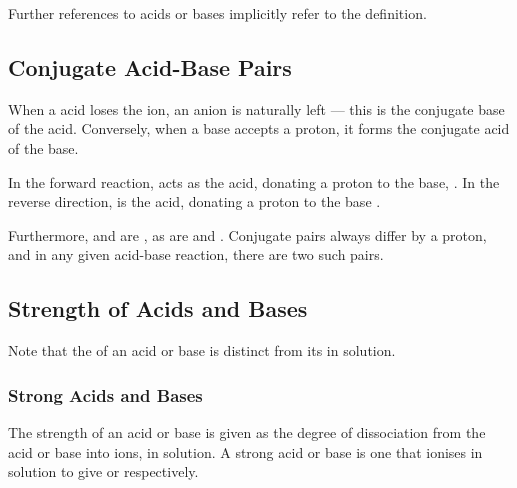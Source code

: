 			Further references to acids or bases implicitly refer to the  definition.




		\pagebreak
		\subsection{Conjugate Acid-Base Pairs}

			When a acid loses the  ion, an anion is naturally left --- this is the conjugate base of the acid. Conversely, when a
			base accepts a proton, it forms the conjugate acid of the base.


			In the forward reaction,  acts as the acid, donating a proton to the base, . In the reverse direction,
			 is the acid, donating a proton to the base .

			 Furthermore,  and  are , as are  and . Conjugate pairs always
			 differ by a proton, and in any given acid-base reaction, there are two such pairs.



		\subsection{Strength of Acids and Bases}

			Note that the  of an acid or base is distinct from its  in solution.

			\subsubsection{Strong Acids and Bases}

				The strength of an acid or base is given as the degree of dissociation from the acid or base into ions, in solution. A strong
				acid or base is one that ionises  in solution to give  or  respectively.

